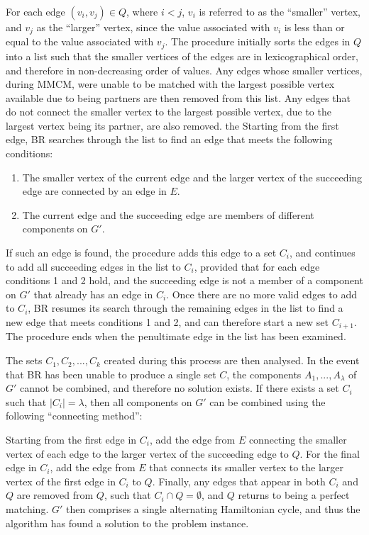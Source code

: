 \documentclass[oribibl]{llncs}
\begin{document}
For each edge $(v_i, v_j) \in Q$, where $i < j$, $v_i$ is referred to as the ``smaller'' vertex, and $v_j$ as the ``larger'' vertex, since the value associated with $v_i$ is less than or equal to the value associated with $v_j$. The procedure initially sorts the edges in $Q$ into a list such that the smaller vertices of the edges are in lexicographical order, and therefore in non-decreasing order of values. Any edges whose smaller vertices, during MMCM, were unable to be matched with the largest possible vertex available due to being partners are then removed from this list. Any edges that do not connect the smaller vertex to the largest possible vertex, due to the largest vertex being its partner, are also removed. the Starting from the first edge, BR searches through the list to find an edge that meets the following conditions:
\begin{enumerate}
	\item The smaller vertex of the current edge and the larger vertex of the succeeding edge are connected by an edge in $E$.
	\item The current edge and the succeeding edge are members of different components on $G'$.
\end{enumerate}

If such an edge is found, the procedure adds this edge to a set $C_i$, and continues to add all succeeding edges in the list to $C_i$, provided that for each edge conditions 1 and 2 hold, and the succeeding edge is not a member of a component on $G'$ that already has an edge in $C_i$. Once there are no more valid edges to add to $C_i$, BR resumes its search through the remaining edges in the list to find a new edge that meets conditions 1 and 2, and can therefore start a new set $C_{i+1}$. The procedure ends when the penultimate edge in the list has been examined.

The sets $C_1, C_2, ..., C_k$ created during this process are then analysed. In the event that BR has been unable to produce a single set $C$, the components $A_1,..., A_{\lambda}$ of $G'$ cannot be combined, and therefore no solution exists. If there exists a set $C_i$ such that $|C_i| = \lambda$, then all components on $G'$ can be combined using the following ``connecting method'':

Starting from the first edge in $C_i$, add the edge from $E$ connecting the smaller vertex of each edge to the larger vertex of the succeeding edge to $Q$. For the final edge in $C_i$, add the edge from $E$ that connects its smaller vertex to the larger vertex of the first edge in $C_i$ to $Q$. Finally, any edges that appear in both $C_i$ and $Q$ are removed from $Q$, such that $C_i \cap Q = \emptyset$, and $Q$ returns to being a perfect matching. $G'$ then comprises a single alternating Hamiltonian cycle, and thus the algorithm has found a solution to the problem instance.
\end{document}
